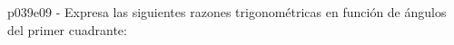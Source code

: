 \documentclass[spanish, 11pt]{exam}
\begin{document}
\begin{questions}
\begin{multicols}{1}
\begin{parts}
        \end{parts}
        \end{multicols}
        \question p039e09 - Expresa las siguientes razones trigonométricas en función de ángulos del primer cuadrante:
        \begin{multicols}{2} 
        \begin{parts} \part[1]  $ \sin(-120) $  \begin{solution}  $ \left [ 60, \quad - \frac{\sqrt{3}}{2}\right ] $  \end{solution} \part[1]  $ \sin(2700) $  \begin{solution}  $ \left [ 0, \quad 0\right ] $  \end{solution} \part[1]  $ \cos(-30) $  \begin{solution}  $ \left [ 30, \quad \frac{\sqrt{3}}{2}\right ] $  \end{solution} \part[1]  $ \cos(3000) $  \begin{solution}  $ \left [ 60, 
\end{multicols}
\end{questions}
\end{document}
